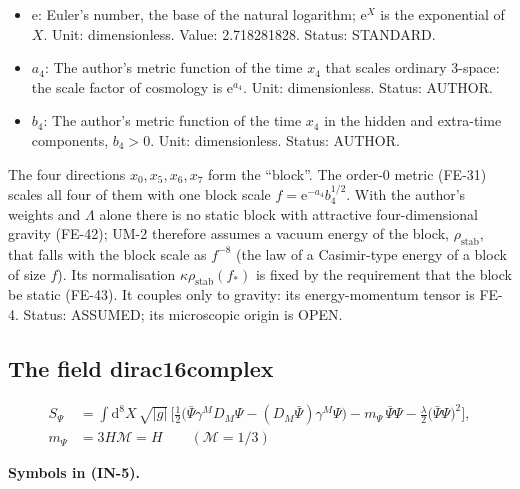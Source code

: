 \documentclass[
  10pt,
]{article}
\begin{document}
\begin{itemize}
  \(f_* = K_*^{-1/2}\). Unit: dimensionless. Value: 0.215556. Status:
  DERIVED.
\item
  \(\mathrm{e}\): Euler's number, the base of the natural logarithm;
  \(\mathrm{e}^{X}\) is the exponential of \(X\). Unit: dimensionless.
  Value: 2.718281828. Status: STANDARD.
\item
  \(a_4\): The author's metric function of the time \(x_4\) that scales
  ordinary 3-space: the scale factor of cosmology is
  \(\mathrm{e}^{a_4}\). Unit: dimensionless. Status: AUTHOR.
\item
  \(b_4\): The author's metric function of the time \(x_4\) in the
  hidden and extra-time components, \(b_4 > 0\). Unit: dimensionless.
  Status: AUTHOR.
\end{itemize}

The four directions \(x_0, x_5, x_6, x_7\) form the ``block''. The
order-0 metric (FE-31) scales all four of them with one block scale
\(f = \mathrm{e}^{-a_4}b_4^{1/2}\). With the author's weights and
\(\Lambda\) alone there is no static block with attractive
four-dimensional gravity (FE-42); UM-2 therefore assumes a vacuum energy
of the block, \(\rho_{\mathrm{stab}}\), that falls with the block scale
as \(f^{-8}\) (the law of a Casimir-type energy of a block of size
\(f\)). Its normalisation \(\kappa\rho_{\mathrm{stab}}(f_*)\) is fixed
by the requirement that the block be static (FE-43). It couples only to
gravity: its energy-momentum tensor is FE-4. Status: ASSUMED; its
microscopic origin is OPEN.

\hypertarget{the-field-dirac16complex}{%
\subsection{The field dirac16complex}\label{the-field-dirac16complex}}

\[
\begin{aligned}
S_\Psi &= \int\mathrm{d}^8X\,\sqrt{\lvert g\rvert}\,\Big[\tfrac12\big(\bar\Psi\gamma^MD_M\Psi
 - (D_M\bar\Psi)\gamma^M\Psi\big) - m_\Psi\,\bar\Psi\Psi - \frac{\lambda}{2}\big(\bar\Psi\Psi\big)^2\Big],\\
m_\Psi &= 3H\mathcal{M} = H\qquad (\mathcal{M} = 1/3)
\end{aligned} \tag{IN-5}
\]

\textbf{Symbols in (IN-5).}
\end{document}
